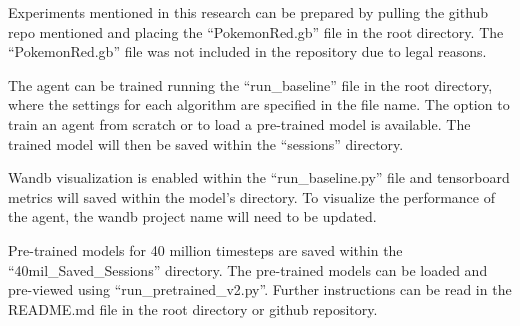 Experiments mentioned in this research can be prepared by pulling the github repo mentioned and placing the ``PokemonRed.gb'' file in the root directory. The ``PokemonRed.gb'' file was not included in the repository due to legal reasons. 

The agent can be trained running the ``run\_baseline'' file in the root directory, where the settings for each algorithm are specified in the file name. The option to train an agent from scratch or to load a pre-trained model is available. The trained model will then be saved within the ``sessions'' directory.

Wandb visualization is enabled within the ``run\_baseline.py'' file and tensorboard metrics will saved within the model's directory. To visualize the performance of the agent, the wandb project name will need to be updated.

Pre-trained models for 40 million timesteps are saved within the ``40mil\_Saved\_Sessions'' directory. The pre-trained models can be loaded and pre-viewed using ``run\_pretrained\_v2.py''. Further instructions can be read in the README.md file in the root directory or github repository.